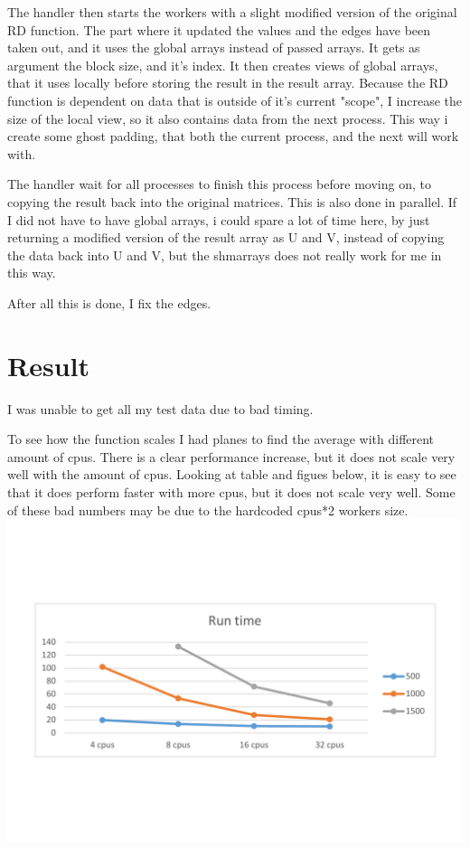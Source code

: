 \documentclass{Article}
\begin{document}
The handler then starts the workers with a slight modified version of the original RD function. The part where it updated the values and the edges have been taken out, and it uses the global arrays instead of passed arrays. It gets as argument the block size, and it's index. It then creates views of global arrays, that it uses locally before storing the result in the result array. Because the RD function is dependent on data that is outside of it's current "scope", I increase the size of the local view, so it also contains data from the next process. This way i create some ghost padding, that both the current process, and the next will work with.

The handler wait for all processes to finish this process before moving on, to copying the result back into the original matrices. This is also done in parallel. If I did not have to have global arrays, i could spare a lot of time here, by just returning a modified version of the result array as U and V, instead of copying the data back into U and V, but the shmarrays does not really work for me in this way.

After all this is done, I fix the edges.

\section{Result}
I was unable to get all my test data due to bad timing.

To see how the function scales I had planes to find the average with different amount of cpus. There is a clear performance increase, but it does not scale very well with the amount of cpus. Looking at table and figues below, it is easy to see that it does perform faster with more cpus, but it does not scale very well. Some of these bad numbers may be due to the hardcoded cpus*2 workers size.
\includegraphics[clip, trim=0 5cm 0 5cm, width=1\textwidth]{plots}\\
\end{document}
